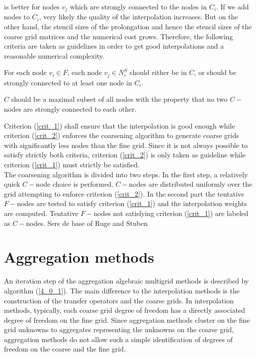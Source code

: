 is better for nodes $v_j$ which are strongly connected to the nodes in $C_i$.
If we add nodes to $C_i$, very likely the quality of the interpolation
increases. But on the other hand, the stencil sizes of the prolongation and
hence the stencil sizes of the coarse grid matrices and the numerical cost
grows. Therefore, the following criteria are taken as guidelines in order to
get good interpolations and a reasonable numerical complexity.
\begin{criterion}
For each node $v_i\in F$, each node $v_j\in N_i^S$ should either be in $C$, or
should be strongly connected to at least one node in $C_i$.
\label{crit_1}
\end{criterion}
\begin{criterion}
$C$ should be a maximal subset of all nodes with the property that no two
$C-$nodes are strongly connected to each other.
\label{crit_2}
\end{criterion}
Criterion (\ref{crit_1}) shall ensure that the interpolation is good enough
while criterion (\ref{crit_2}) enforces the coarsening algorithm to generate
coarse grids with significantly less nodes than the fine grid. Since it is not
always possible to satisfy strictly both criteria, criterion (\ref{crit_2}) is
only taken as guideline while criterion (\ref{crit_1}) must strictly be
satisfied.\\
The coarsening algorithm is divided into two steps. In the first step, a
relatively quick $C-$node choice is performed. $C-$nodes are distributed
uniformly over the grid attempting to enforce criterion (\ref{crit_2}). In the
second part the tentative $F-$nodes are tested to satisfy criterion
(\ref{crit_1}) and the interpolation weights are computed. Tentative $F-$nodes
not satisfying criterion (\ref{crit_1}) are labeled as $C-$nodes.
Sers de base of Ruge and Stuben

\section{Aggregation methods}
An iteration step of the aggregation algebraic multigrid methods is described
by algorithm (\ref{4_0_1}). The main difference to the interpolation methods
is the construction of the transfer operators and the coarse grids. In
interpolation methods, typically, each coarse grid degree of freedom has a
directly associated degree of freedom on the fine grid. Since aggregation
methods cluster on the fine grid unknowns to aggregates representing the
unknowns on the coarse grid, aggregation methods do not allow such a simple
identification of degrees of freedom on the coarse and the fine grid.

